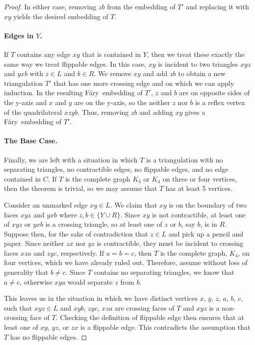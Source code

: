 \documentclass{patmorin}
\newcommand{\Fary}{Fáry}
\begin{document}
\begin{proof}
   In either case, removing $zb$ from the embedding of $T'$ and replacing
   it with $xy$ yields the desired embedding of $T$.

   \paragraph{Edges in $Y$.}

   If $T$ contains any edge $xy$ that is contained in $Y$, then we treat
   these exactly the same way we treat flippable edges.  In this case,
   $xy$ is incident to two triangles $xyz$ and $yxb$ with $z\in L$ and
   $b\in R$. We remove $xy$ and add $zb$ to obtain a new triangulation
   $T'$ that has one more crossing edge and on which we can apply
   induction.  In the resulting \Fary\ embedding of $T'$, $z$ and $b$ are
   on opposite sides of the y-axis and $x$ and $y$ are on the y-axis, so
   the neither $z$ nor $b$ is a reflex vertex of the quadrilateral $xzyb$.
   Thus, removing $zb$ and adding $xy$ gives a \Fary\ embedding of $T'$.

   \paragraph{The Base Case.}

   Finally, we are left with a situation in which $T$ is a triangulation
   with no separating triangles, no contractible edges, no flippable
   edges, and no edge contained in $C$.  If $T$ is the complete graph
   $K_3$ or $K_4$ on three or four vertices, then the theorem is trivial,
   so we may assume that $T$ has at least 5 vertices.

   Consider an unmarked edge $xy \in L$.  We claim that $xy$ is on the
   boundary of two faces $xyz$ and $yxb$ where $z,b\in\{Y\cup R\}$.
   Since $xy$ is not contractible, at least one of $xyz$ or $yxb$ is a
   crossing triangle, so at least one of $z$ or $b$, say $b$, is in $R$.
   Suppose then, for the sake of contradiction that $z\in L$ and pick up
   a pencil and paper. Since neither $zx$ nor $yz$ is contractible,
   they must be incident to crossing faces $xza$ and $zyc$, respectively.
   If $a=b=c$, then $T$ is the complete graph, $K_4$, on four vertices,
   which we have already ruled out.  Therefore, assume without loss of
   generality that $b\neq c$.  Since $T$ contains no separating triangles,
   we know that $a\neq c$, otherwise $xya$ would separate $z$ from $b$.

   This leaves us in the situation in which we have distinct vertices $x$,
   $y$, $z$, $a$, $b$, $c$, such that $xyz\in L$ and $xyb$, $zyc$, $xza$
   are crossing faces of $T$ and $xyz$ is a non-crossing face of $T$.
   Checking the definition of flippable edge then ensures that at least
   one of $xy$, $yz$, or $zx$ is a flippable edge. This contradicts the
   assumption that $T$ has no flippable edges.


\end{proof}
\end{document}
